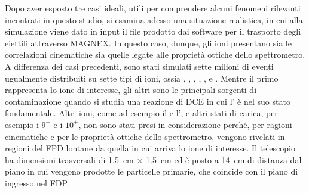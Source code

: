
Dopo aver esposto tre casi ideali, utili per comprendere alcuni fenomeni rilevanti incontrati in questo studio, si esamina adesso una situazione realistica, in cui alla simulazione \geant{} viene dato in input il file prodotto dai software per il trasporto degli eiettili attraverso MAGNEX.
In questo caso, dunque, gli ioni presentano sia le correlazioni cinematiche sia quelle legate alle proprietà ottiche dello spettrometro.
A differenza dei casi precedenti, sono stati simulati sette milioni di eventi ugualmente distribuiti su sette tipi di ioni, ossia , , , , ,  e .
Mentre il primo rappresenta lo ione di interesse, gli altri sono le principali sorgenti di contaminazione quando si studia una reazione di DCE in cui l' è nel suo stato fondamentale.
Altri ioni, come ad esempio il  e l', e altri stati di carica, per esempio i $9^+$ e i $10^+$, non sono stati presi in considerazione perché, per ragioni cinematiche e per le proprietà ottiche dello spettrometro, vengono rivelati in regioni del FPD lontane da quella in cui arriva lo ione di interesse.
Il telescopio ha dimensioni trasversali di 1.5~cm $\times$ 1.5~cm ed è posto a 14~cm di distanza dal piano in cui vengono prodotte le particelle primarie, che coincide con il piano di ingresso nel FDP.



